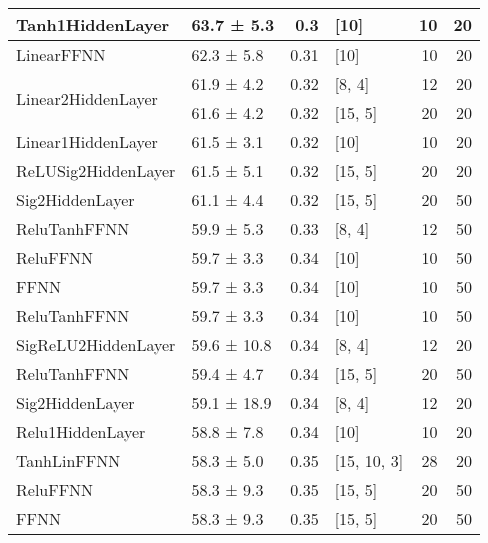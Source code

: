\begin{longtable}{llrlrr}
 \hline
Tanh1HiddenLayer                    & 63.7 ± 5.3  &  0.3  & [10]           &         10 &       20 \\
 \hline
LinearFFNN                          & 62.3 ± 5.8  &  0.31 & [10]           &         10 &       20 \\
 \hline
\multirow{2}{*}{Linear2HiddenLayer} & 61.9 ± 4.2  &  0.32 & [8, 4]         &         12 &       20 \\
                                            & 61.6 ± 4.2  &  0.32 & [15, 5]        &         20 &       20 \\
 \hline
Linear1HiddenLayer                  & 61.5 ± 3.1  &  0.32 & [10]           &         10 &       20 \\
 \hline
ReLUSig2HiddenLayer                 & 61.5 ± 5.1  &  0.32 & [15, 5]        &         20 &       20 \\
 \hline
Sig2HiddenLayer                     & 61.1 ± 4.4  &  0.32 & [15, 5]        &         20 &       50 \\
 \hline
ReluTanhFFNN                        & 59.9 ± 5.3  &  0.33 & [8, 4]         &         12 &       50 \\
 \hline
ReluFFNN                            & 59.7 ± 3.3  &  0.34 & [10]           &         10 &       50 \\
 \hline
FFNN                                & 59.7 ± 3.3  &  0.34 & [10]           &         10 &       50 \\
 \hline
ReluTanhFFNN                        & 59.7 ± 3.3  &  0.34 & [10]           &         10 &       50 \\
 \hline
SigReLU2HiddenLayer                 & 59.6 ± 10.8 &  0.34 & [8, 4]         &         12 &       20 \\
 \hline
ReluTanhFFNN                        & 59.4 ± 4.7  &  0.34 & [15, 5]        &         20 &       50 \\
 \hline
Sig2HiddenLayer                     & 59.1 ± 18.9 &  0.34 & [8, 4]         &         12 &       20 \\
 \hline
Relu1HiddenLayer                    & 58.8 ± 7.8  &  0.34 & [10]           &         10 &       20 \\
 \hline
TanhLinFFNN                         & 58.3 ± 5.0  &  0.35 & [15, 10, 3]    &         28 &       20 \\
 \hline
ReluFFNN                            & 58.3 ± 9.3  &  0.35 & [15, 5]        &         20 &       50 \\
 \hline
FFNN                                & 58.3 ± 9.3  &  0.35 & [15, 5]        &         20 &       50 \\

\end{longtable}
